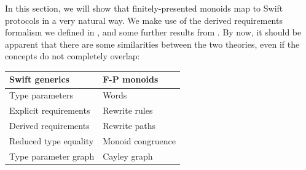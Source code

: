 \documentclass[../generics]{subfiles}
\begin{document}
In this section, we will show that finitely-presented monoids map to Swift protocols in a very natural way. We make use of the derived requirements formalism we defined in , and some further results from . By now, it should be apparent that there are some similarities between the two theories, even if the concepts do not completely overlap:
\begin{center}
\begin{tabular}{ll}
\toprule
\textbf{Swift generics}&\textbf{F-P monoids}\\
\midrule
Type parameters&Words\\
Explicit requirements&Rewrite rules\\
Derived requirements&Rewrite paths\\
Reduced type equality&Monoid congruence\\
\index{type parameter graph!Cayley graph}Type parameter graph&\index{Cayley graph}Cayley graph\\
\bottomrule
\end{tabular}
\end{center}

\newcommand{\GM}{G_\texttt{M}}
\end{document}
